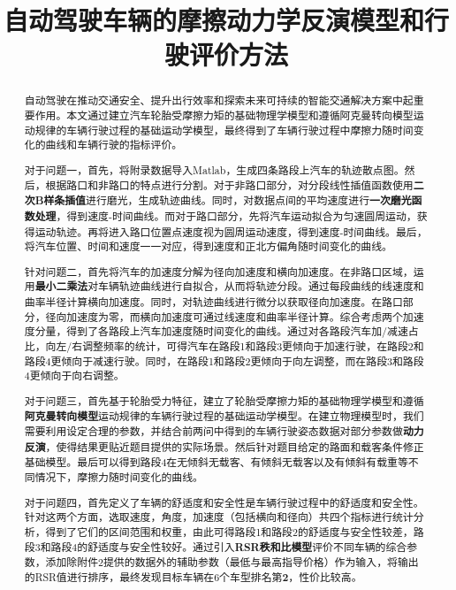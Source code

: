 \documentclass[withoutpreface,bwprint]{cumcmthesis} %
\title{自动驾驶车辆的摩擦动力学反演模型和行驶评价方法}
\begin{document}
 \maketitle
 \begin{abstract}

自动驾驶在推动交通安全、提升出行效率和探索未来可持续的智能交通解决方案中起重要作用。本文通过建立汽车轮胎受摩擦力矩的基础物理学模型和遵循阿克曼转向模型运动规律的车辆行驶过程的基础运动学模型，最终得到了车辆行驶过程中摩擦力随时间变化的曲线和车辆行驶的指标评价。

对于问题一，首先，将附录数据导入Matlab，生成四条路段上汽车的轨迹散点图。然后，根据路口和非路口的特点进行分割。对于非路口部分，对分段线性插值函数使用\textbf{二次B样条插值}进行磨光，生成轨迹曲线。同时，对数据点间的平均速度进行\textbf{一次磨光函数处理}，得到速度-时间曲线。而对于路口部分，先将汽车运动拟合为匀速圆周运动，获得运动轨迹。再将进入路口位置点速度视为圆周运动速度，得到速度-时间曲线。最后，将汽车位置、时间和速度一一对应，得到速度和正北方偏角随时间变化的曲线。 

针对问题二，首先将汽车的加速度分解为径向加速度和横向加速度。在非路口区域，运用\textbf{最小二乘法}对车辆轨迹曲线进行自拟合，从而将轨迹分段。通过每段曲线的线速度和曲率半径计算横向加速度。同时，对轨迹曲线进行微分以获取径向加速度。在路口部分，径向加速度为零，而横向加速度可通过线速度和曲率半径计算。综合考虑两个加速度分量，得到了各路段上汽车加速度随时间变化的曲线。通过对各路段汽车加/减速占比，向左/右调整频率的统计，可得汽车在路段1和路段3更倾向于加速行驶，在路段2和路段4更倾向于减速行驶。同时，在路段1和路段2更倾向于向左调整，而在路段3和路段4更倾向于向右调整。

对于问题三，首先基于轮胎受力特征，建立了轮胎受摩擦力矩的基础物理学模型和遵循\textbf{阿克曼转向模型}运动规律的车辆行驶过程的基础运动学模型。在建立物理模型时，我们需要利用设定合理的参数，并结合前两问中得到的车辆行驶姿态数据对部分参数做\textbf{动力反演}，使得结果更贴近题目提供的实际场景。然后针对题目给定的路面和载客条件修正基础模型。最后可以得到路段4在无倾斜无载客、有倾斜无载客以及有倾斜有载重等不同情况下，摩擦力随时间变化的曲线。

对于问题四，首先定义了车辆的舒适度和安全性是车辆行驶过程中的舒适度和安全性。针对这两个方面，选取速度，角度，加速度（包括横向和径向）共四个指标进行统计分析，得到了它们的区间范围和权重，由此可得路段1和路段2的舒适度与安全性较差，路段3和路段4的舒适度与安全性较好。通过引入\textbf{RSR秩和比模型}评价不同车辆的综合参数，添加除附件2提供的数据外的辅助参数（最低与最高指导价格）作为输入，将输出的RSR值进行排序，最终发现目标车辆在6个车型排名第\textbf{2}，性价比较高。


\end{abstract}
\end{document}
